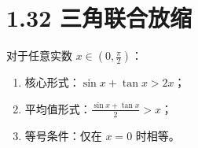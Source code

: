 \documentclass{article}
\begin{document}
\section*{1.32 三角联合放缩}
对于任意实数 \( x \in (0,\frac{\pi}{2}) \)：
\begin{enumerate}
    \item 核心形式：\( \sin x + \tan x > 2x \)；
    \item 平均值形式：\( \frac{\sin x+\tan x}{2} > x \)；
    \item 等号条件：仅在 \( x=0 \) 时相等。
\end{enumerate}
\end{document}
